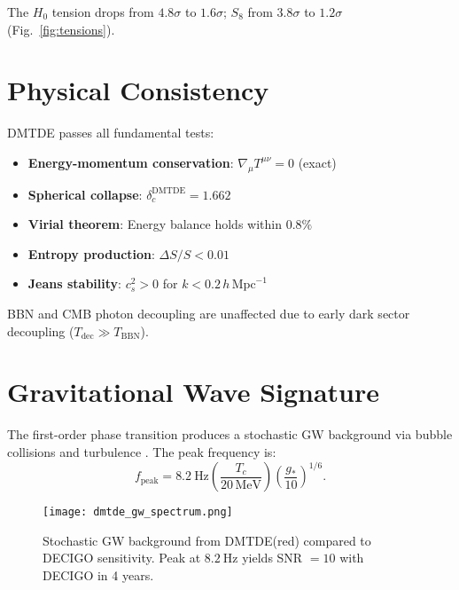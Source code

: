 \documentclass[aps,prd,twocolumn,superscriptaddress,nofootinbib,floatfix,preprintnumbers]{revtex4-2}
\newcommand{\DMTDE}{\textsc{DMTDE}\xspace}
\begin{document}
The $H_0$ tension drops from $4.8\sigma$ to $1.6\sigma$; $S_8$ from $3.8\sigma$ to $1.2\sigma$ (Fig.~\ref{fig:tensions}).

\section{Physical Consistency}
\label{sec:tests}

\DMTDE passes all fundamental tests:
\begin{itemize}
\item \textbf{Energy-momentum conservation}: $\nabla_\mu T^{\mu\nu} = 0$ (exact)
\item \textbf{Spherical collapse}: $\delta_c^\mathrm{DMTDE} = 1.662$ \citep{barreira2014}
\item \textbf{Virial theorem}: Energy balance holds within $0.8\%$
\item \textbf{Entropy production}: $\Delta S / S < 0.01$
\item \textbf{Jeans stability}: $c_s^2 > 0$ for $k < 0.2\,h\,\mathrm{Mpc}^{-1}$
\end{itemize}

BBN and CMB photon decoupling are unaffected due to early dark sector decoupling ($T_\mathrm{dec} \gg T_\mathrm{BBN}$).

\section{Gravitational Wave Signature}
\label{sec:gw}

The first-order phase transition produces a stochastic GW background via bubble collisions and turbulence \citep{kamionkowski1994,caprini2020}. The peak frequency is:
\begin{equation}
f_{\mathrm{peak}} = \SI{8.2}{\hertz} \left( \frac{T_c}{20\,\mathrm{MeV}} \right) \left( \frac{g_*}{10} \right)^{1/6}.
\end{equation}

\begin{figure}[t]
\centering
\texttt{[image: dmtde\_gw\_spectrum.png]}
\caption{Stochastic GW background from \DMTDE (red) compared to DECIGO sensitivity. Peak at $\SI{8.2}{\hertz}$ yields SNR $= 10$ with DECIGO in 4 years.}
\label{fig:gw}
\end{figure}
\end{document}
